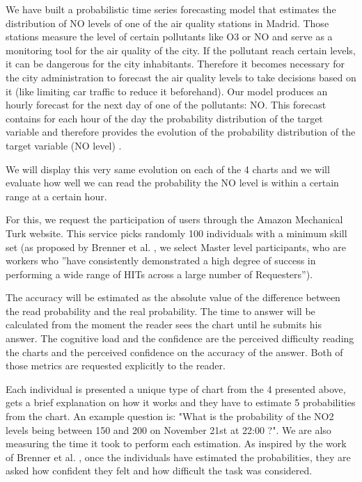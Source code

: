 \documentclass[a4paper,3p,sort&compress]{elsarticle}
\begin{document}
We have built a probabilistic time series forecasting model that estimates the distribution of NO 
levels of one of the air quality stations in Madrid. Those stations measure the level of certain 
pollutants like O3 or NO and serve as a monitoring tool for the air quality of the city. If the pollutant 
reach certain levels, it can be dangerous for the city inhabitants. Therefore it becomes necessary 
for the city administration to 
forecast the air quality levels to take decisions based on it (like limiting car traffic to reduce it beforehand).
Our model produces an hourly forecast for the next day of one of the pollutants: NO. This forecast contains
for each hour of the day the probability distribution of the target variable and therefore provides the evolution 
of the probability distribution of the target variable (NO level) .

We will display this very same evolution on each of the 4 charts and we will evaluate how well we can 
read the probability the NO level is within a certain range at a certain hour. 

For this, we request the participation of users through the Amazon Mechanical Turk website. 
This service picks randomly 100 individuals with a minimum skill set (as proposed by Brenner 
et al. \cite{brennen_instrument_2018}, we select Master level participants, who are workers who 
''have consistently demonstrated a high degree of success in performing a wide range of HITs across a 
large number of Requesters'').

The accuracy will be estimated as the 
absolute value of the difference between the read probability and the real probability. The time to answer 
will be calculated from the moment the reader sees the chart until he submits his answer. The cognitive 
load and the confidence are the perceived difficulty reading the charts and the perceived confidence on the accuracy of 
the answer. Both of those metrics are requested explicitly to the reader.

Each individual is presented a unique type of chart from the 4 presented above, gets a brief 
explanation on how it works and they have to estimate 5 probabilities from the chart. An example question is: 
"What is the probability of the NO2 levels being between 150 and 200 on 
November 21st at 22:00 ?". We are also measuring the time it took to perform each estimation. 
As inspired by the work of Brenner et 
al. , once the individuals have estimated the probabilities, they are asked how confident they 
felt and how difficult the task was considered.
\end{document}
